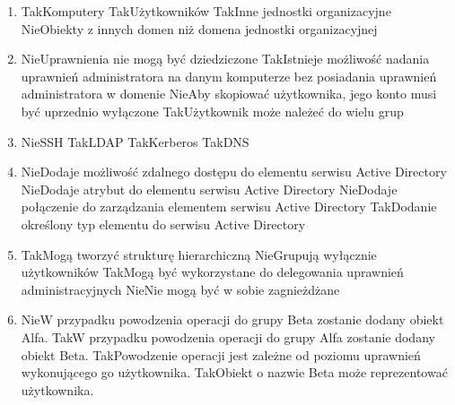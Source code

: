 \begin{enumerate}
		{Tak}{Obsługa zabezpieczeń}%
		{Tak}{Zgodność z TCP/IP}
		\item {}%
		{Tak}{Komputery}%
		{Tak}{Użytkowników}%
		{Tak}{Inne jednostki organizacyjne}%
		{Nie}{Obiekty z innych domen niż domena jednostki organizacyjnej}
		\item {}%
		{Nie}{Uprawnienia nie mogą być dziedziczone}%
		{Tak}{Istnieje możliwość nadania uprawnień administratora na danym komputerze bez posiadania uprawnień administratora w domenie}%
		{Nie}{Aby skopiować użytkownika, jego konto musi być uprzednio wyłączone}%
		{Tak}{Użytkownik może należeć do wielu grup}
		\item {}%
		{Nie}{SSH}%
		{Tak}{LDAP}%
		{Tak}{Kerberos}%
		{Tak}{DNS}
		\item {}%
		{Nie}{Dodaje możliwość zdalnego dostępu do elementu serwisu Active Directory}%
		{Nie}{Dodaje atrybut do elementu serwisu Active Directory}%
		{Nie}{Dodaje połączenie do zarządzania elementem serwisu Active Directory}%
		{Tak}{Dodanie określony typ elementu do serwisu Active Directory}
		\item {}%
		{Tak}{Mogą tworzyć strukturę hierarchiczną}%
		{Nie}{Grupują wyłącznie użytkowników}%
		{Tak}{Mogą być wykorzystane do delegowania uprawnień administracyjnych}%
		{Nie}{Nie mogą być w sobie zagnieżdżane}
		\item {}%
		{Nie}{W przypadku powodzenia operacji do grupy Beta zostanie dodany obiekt Alfa.}%
		{Tak}{W przypadku powodzenia operacji do grupy Alfa zostanie dodany obiekt Beta.}%
		{Tak}{Powodzenie operacji jest zależne od poziomu uprawnień wykonującego go użytkownika.}%
		{Tak}{Obiekt o nazwie Beta może reprezentować użytkownika.}
	\end{enumerate}
